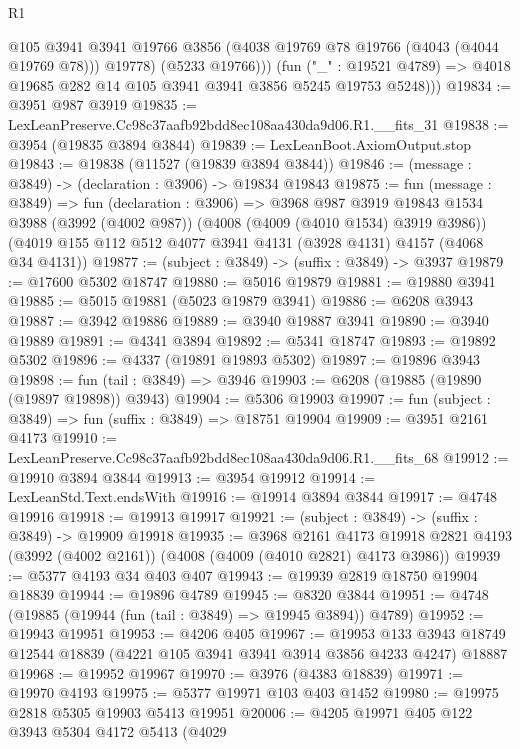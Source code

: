 \begin{lexlean}{R1}
\begin{coremodule}
              @105
              @3941
              @3941
              @19766
              @3856
              (@4038 @19769 @78 @19766 (@4043 (@4044 @19769 @78)))
              @19778)
            (@5233 @19766)))
        (fun ("_" : @19521 @4789) =>
        @4018 @19685 @282 @14 @105 @3941 @3941 @3856 @5245 @19753 @5248)))
@19834 := @3951 @987 @3919
@19835 := LexLeanPreserve.Cc98c37aafb92bdd8ec108aa430da9d06.R1.__fits_31
@19838 := @3954 (@19835 @3894 @3844)
@19839 := LexLeanBoot.AxiomOutput.stop
@19843 := @19838 (@11527 (@19839 @3894 @3844))
@19846 := (message : @3849) -> (declaration : @3906) -> @19834 @19843
@19875 := fun (message : @3849) =>
  fun (declaration : @3906) =>
  @3968
    @987
    @3919
    @19843
    @1534
    @3988
    (@3992 (@4002 @987))
    (@4008 (@4009 (@4010 @1534) @3919 @3986))
    (@4019 @155 @112 @512 @4077 @3941 @4131 (@3928 @4131) @4157 (@4068 @34 @4131))
@19877 := (subject : @3849) -> (suffix : @3849) -> @3937
@19879 := @17600 @5302 @18747
@19880 := @5016 @19879
@19881 := @19880 @3941
@19885 := @5015 @19881 (@5023 @19879 @3941)
@19886 := @6208 @3943
@19887 := @3942 @19886
@19889 := @3940 @19887 @3941
@19890 := @3940 @19889
@19891 := @4341 @3894
@19892 := @5341 @18747
@19893 := @19892 @5302
@19896 := @4337 (@19891 @19893 @5302)
@19897 := @19896 @3943
@19898 := fun (tail : @3849) => @3946
@19903 := @6208 (@19885 (@19890 (@19897 @19898)) @3943)
@19904 := @5306 @19903
@19907 := fun (subject : @3849) => fun (suffix : @3849) => @18751 @19904
@19909 := @3951 @2161 @4173
@19910 := LexLeanPreserve.Cc98c37aafb92bdd8ec108aa430da9d06.R1.__fits_68
@19912 := @19910 @3894 @3844
@19913 := @3954 @19912
@19914 := LexLeanStd.Text.endsWith
@19916 := @19914 @3894 @3844
@19917 := @4748 @19916
@19918 := @19913 @19917
@19921 := (subject : @3849) -> (suffix : @3849) -> @19909 @19918
@19935 := @3968
    @2161
    @4173
    @19918
    @2821
    @4193
    (@3992 (@4002 @2161))
    (@4008 (@4009 (@4010 @2821) @4173 @3986))
@19939 := @5377 @4193 @34 @403 @407
@19943 := @19939 @2819 @18750 @19904 @18839
@19944 := @19896 @4789
@19945 := @8320 @3844
@19951 := @4748 (@19885 (@19944 (fun (tail : @3849) => @19945 @3894)) @4789)
@19952 := @19943 @19951
@19953 := @4206 @405
@19967 := @19953
    @133
    @3943
    @18749
    @12544
    @18839
    (@4221 @105 @3941 @3941 @3914 @3856 @4233 @4247)
    @18887
@19968 := @19952 @19967
@19970 := @3976 (@4383 @18839)
@19971 := @19970 @4193
@19975 := @5377 @19971 @103 @403 @1452
@19980 := @19975 @2818 @5305 @19903 @5413 @19951
@20006 := @4205
    @19971
    @405
    @122
    @3943
    @5304
    @4172
    @5413
    (@4029

\end{coremodule}
\end{lexlean}
